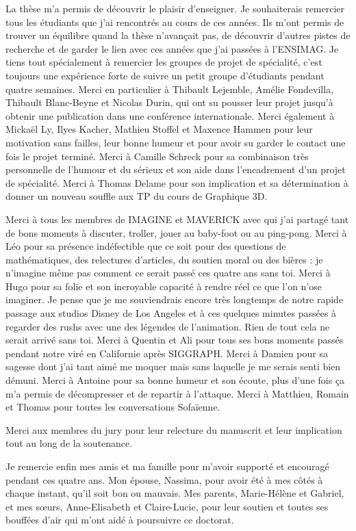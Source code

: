La thèse m'a permis de découvrir le plaisir d'enseigner. Je souhaiterais remercier tous les étudiants que j'ai rencontrés au cours de ces années.
Ils m'ont permis de trouver un équilibre quand la thèse n’avançait pas, de découvrir d'autres pistes de recherche et de garder le lien avec ces années que j'ai passées à l'ENSIMAG. Je tiens tout spécialement à remercier les groupes de projet de spécialité, c'est toujours une expérience forte de suivre un petit groupe d'étudiants pendant quatre semaines. Merci en particulier à Thibault Lejemble, Amélie Fondevilla, Thibault Blanc-Beyne et Nicolas Durin, qui ont su pousser leur projet jusqu'à obtenir une publication dans une conférence internationale. Merci également à Mickaël Ly, Ilyes Kacher, Mathieu Stoffel et Maxence Hammen pour leur motivation sans failles, leur bonne humeur et pour avoir su garder le contact une fois le projet terminé. Merci à Camille Schreck pour sa combinaison très personnelle de l'humour et du sérieux et son aide dans l'encadrement d'un projet de spécialité. Merci à Thomas Delame pour son implication et sa détermination à donner un nouveau souffle aux TP du cours de Graphique 3D.


Merci à tous les membres de IMAGINE et MAVERICK avec qui j'ai partagé tant de bons moments à discuter, troller, jouer au baby-foot ou au ping-pong.
Merci à Léo pour sa présence indéfectible que ce soit pour des questions de mathématiques, des relectures d'articles, du soutien moral ou des bières : je n'imagine même pas comment ce serait passé ces quatre ans sans toi.
Merci à Hugo pour sa folie et son incroyable capacité à rendre réel ce que l'on n'ose imaginer. Je pense que je me souviendrais encore très longtemps de notre rapide passage aux studios Disney de Los Angeles et à ces quelques minutes passées à regarder des rushs avec une des légendes de l'animation. Rien de tout cela ne serait arrivé sans toi.
Merci à Quentin et Ali pour tous ses bons moments passés pendant notre viré en Californie après SIGGRAPH.
Merci à Damien pour sa sagesse dont j'ai tant aimé me moquer mais sans laquelle je me serais senti bien démuni.
Merci à Antoine pour sa bonne humeur et son écoute, plus d'une fois ça m'a permis de décompresser et de repartir à l'attaque.
Merci à Matthieu, Romain et Thomas pour toutes les conversations Sofaïenne.

Merci aux membres du jury pour leur relecture du manuscrit et leur implication tout au long de la soutenance.

Je remercie enfin mes amis et ma famille pour m'avoir supporté et encouragé pendant ces quatre ans.
Mon épouse, Nassima, pour avoir été à mes côtés à chaque instant, qu'il soit bon ou mauvais.
Mes parents, Marie-Hélène et Gabriel, et mes sœurs, Anne-Elisabeth et Claire-Lucie, pour leur soutien et toutes ses bouffées d'air qui m'ont aidé à poursuivre ce doctorat.
